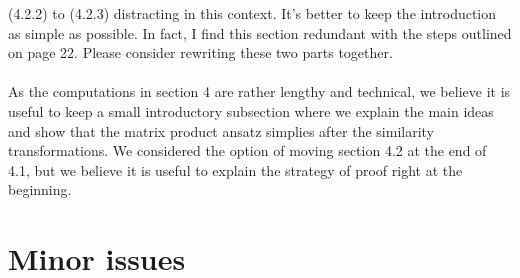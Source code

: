 \documentclass[10pt]{article}
\numberwithin{equation}{section}
\numberwithin{equation}{subsection}
\begin{document}
\begin{enumerate}
{							(4.2.2) to (4.2.3) distracting in this context. It’s better to keep the introduction as simple as possible.
							In fact, I find this section redundant with the steps outlined on page 22. Please consider rewriting
							these two parts together.}\\ \\ 	As the computations in section 4 are rather lengthy and technical, we believe it is useful to keep a small introductory subsection where we explain the main ideas and show that the matrix product ansatz simplies after the similarity transformations.
							We considered the option of moving section 4.2 at the end of 4.1, but we believe it is useful to explain the strategy of proof right at the beginning.							
		\end{enumerate}
		\section*{Minor issues}
\end{document}
